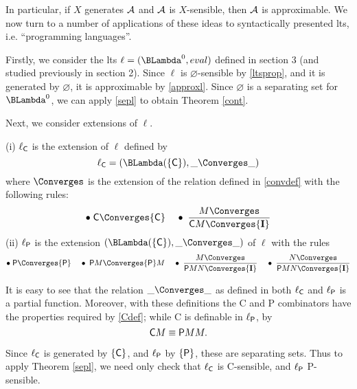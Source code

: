 In particular, if $X$ generates $\cal A$ and $\cal A$ is $X$-sensible, then $\cal A$ is approximable. We now turn to a number of applications of these ideas to syntactically presented lts, i.e. ``programming languages''.

Firstly, we consider the lts $\ell = ({\BLambda}^{0}, eval)$ defined in section 3 (and studied previously in section 2). 
Since $\ell$ is $\varnothing$-sensible by \ref{ltsprop}, and it is generated by $\varnothing$, it is approximable by \ref{approxl}. 
Since $\varnothing$ is a separating set for ${\BLambda}^{0}$, we can apply \ref{sepl} to obtain Theorem \ref{cont}.

Next, we consider extensions of $\ell$.

\begin{definition}
{\rm (i) $\ell_{\sf C}$ is the extension of $\ell$ defined by
\[ \ell_{\sf C} = (\BLambda (\{{\sf C} \}), \_ \Converges \_ ) \]
where $\Converges$ is the extension of the relation defined in \ref{convdef} with the following rules:
\[ \bullet \; {\sf C} \Converges {\sf C} \;\;\;\; \bullet \; \frac{M \Converges}{{\sf C} M \Converges {\bf I}} \]
(ii) $\ell_{\sf P}$ is the extension $(\BLambda (\{{\sf C} \}), \_ \Converges \_ )$ of $\ell$ with the rules}
\[ \bullet \; {\sf P} \Converges {\sf P} \;\;\;\; \bullet \; {\sf P} M \Converges {\sf P} M \;\;\;\; \bullet \; \frac{M \Converges}{{\sf P} M N \Converges {\bf I}} \;\;\;\; \bullet \; \frac{N \Converges}{{\sf P} M N \Converges {\bf I}} \]
\end{definition}

It is easy to see that the relation $\_ \Converges \_$ as defined in both $\ell_{\sf C}$ and $\ell_{\sf P}$ is a partial function. 
Moreover, with these definitions the {\sf C} and {\sf P} combinators have the 
properties required by \ref{Cdef}; while {\sf C} is definable in $\ell_{\sf P}$, by
\[ {\sf C} M \equiv {\sf P} M M . \]

Since $\ell_{\sf C}$ is generated by $\{ {\sf C } \}$, and $\ell_{\sf P}$ by  $\{ {\sf P } \}$, these are separating sets. 
Thus to apply Theorem \ref{sepl}, we need only check that  $\ell_{\sf C}$ is {\sf C}-sensible, and  $\ell_{\sf P}$ {\sf P}-sensible. 

